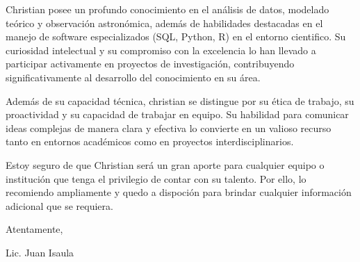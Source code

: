 \documentclass{article}
\begin{document}
Christian posee un profundo conocimiento en el análisis de datos, modelado teórico y observación astronómica, además de habilidades destacadas en el manejo de software especializados (SQL, Python, R) en el entorno cientifico. Su curiosidad intelectual y su compromiso con la excelencia lo han llevado a participar activamente en proyectos de investigación, contribuyendo significativamente al desarrollo del conocimiento en su área. 
 
Además de su capacidad técnica, christian se distingue por su ética de trabajo, su proactividad y su capacidad de trabajar en equipo. Su habilidad para comunicar ideas complejas de manera clara y efectiva lo convierte en un valioso recurso tanto en entornos académicos como en proyectos interdisciplinarios. 

Estoy seguro de que Christian será un gran aporte para cualquier equipo o institución que tenga el privilegio de contar con su talento. Por ello, lo recomiendo ampliamente y quedo a dispoción para brindar cualquier información adicional que se requiera.

\bigskip %

Atentamente, 

\vspace{50pt} %

Lic. Juan Isaula 
\end{document}
